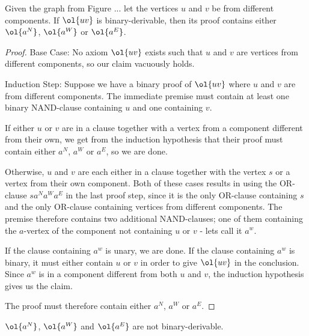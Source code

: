 \begin{lemma}
  Given the graph from Figure ... let the vertices $u$ and $v$ be from different components.
  If $\ol{uv}$ is binary-derivable, then its proof contains either $\ol{a^N}$, $\ol{a^W}$ or $\ol{a^E}$.
  \label{thm:uv_proof_contains_a}
\end{lemma}

\begin{proof}
  Base Case:
  No axiom $\ol{uv}$ exists such that $u$ and $v$ are vertices from different components, so our claim vacuously holds.

  Induction Step:
  Suppose we have a binary proof of $\ol{uv}$ where $u$ and $v$ are from different components.
  The immediate premise must contain at least one binary NAND-clause containing $u$ and one containing $v$.
  \begin{figure}[!h]
    \centering
    \begin{prooftree*}
      \Hypo{\dots}
    \end{prooftree*}
    \caption{}
    \label{fig:proof_scheme_uv}
  \end{figure}
  If either $u$ or $v$ are in a clause together with a vertex from a component different from their own, we get from the induction hypothesis that their proof must contain either $a^N$, $a^W$ or $a^E$, so we are done.

  Otherwise, $u$ and $v$ are each either in a clause together with the vertex $s$ or a vertex from their own component.
  Both of these cases results in using the OR-clause $sa^Na^Wa^E$ in the last proof step, since it is the only OR-clause containing $s$ and the only OR-clause containing vertices from different components.
  The premise therefore contains two additional NAND-clauses; one of them containing the $a$-vertex of the component not containing $u$ or $v$ - lets call it $a^w$.

  If the clause containing $a^w$ is unary, we are done.
  If the clause containing $a^w$ is binary, it must either contain $u$ or $v$ in order to give $\ol{uv}$ in the conclusion.
  Since $a^w$ is in a component different from both $u$ and $v$, the induction hypothesis gives us the claim.

  The proof must therefore contain either $a^N$, $a^W$ or $a^E$.
\end{proof}

\begin{lemma}
  $\ol{a^N}$, $\ol{a^W}$ and $\ol{a^E}$ are not binary-derivable.
  \label{thm:non_binary_derivable_a}
\end{lemma}

